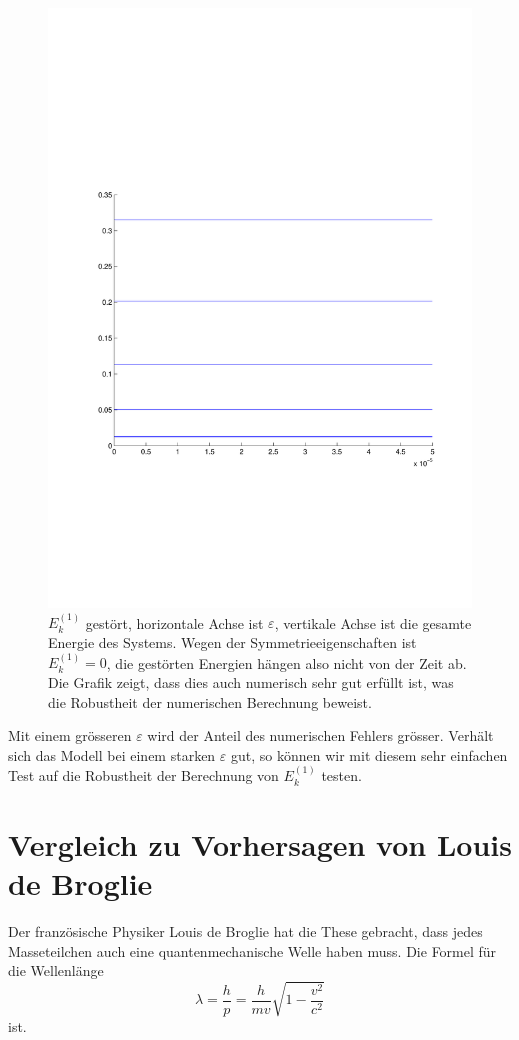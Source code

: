 \begin{refsection}
\begin{figure}
 \centering
 \includegraphics[width=12cm,clip=true,trim=2cm 7cm 1cm 8cm]{efeld/Energie_gestoert.pdf}
 \caption{$E_k^{(1)}$ gest\"ort, horizontale Achse ist $\varepsilon$, vertikale Achse ist die gesamte Energie des Systems.
       Wegen der Symmetrieeigenschaften ist $E_k^{(1)}=0$, die
gest\"orten Energien h\"angen also nicht von der Zeit ab. Die Grafik zeigt, dass dies auch numerisch sehr gut erf\"ullt ist, was die Robustheit der numerischen Berechnung beweist.}
 \label{abb:efeld_E_gestoert}
\end{figure}

Mit einem gr\"osseren $\varepsilon$ wird der Anteil des numerischen Fehlers gr\"osser.
Verh\"alt sich das Modell bei einem starken $\varepsilon$ gut, so k\"onnen wir mit diesem sehr einfachen Test
auf die Robustheit der Berechnung von $E_k^{(1)}$ testen.


\section{Vergleich zu Vorhersagen von Louis de Broglie}
Der franz\"osische Physiker Louis de Broglie hat die These gebracht,
dass jedes Masseteilchen auch eine quantenmechanische Welle haben muss.
Die Formel f\"ur die Wellenl\"ange
\begin{equation}
  \label{efeld:eq_deBroglie}
  \lambda = \frac{h}{p} = \frac {h}{{m}{v}} \sqrt{1 - \frac{v^2}{c^2}}
\end{equation}
ist.


\end{refsection}
